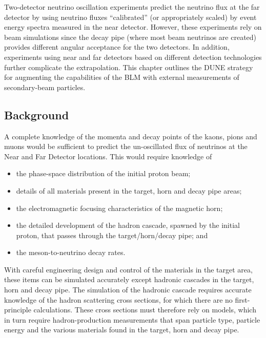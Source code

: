 Two-detector neutrino oscillation experiments predict the neutrino
flux at the far detector by using neutrino fluxes ``calibrated'' (or
appropriately scaled) by event energy spectra measured in the near
detector. However, these experiments rely on beam simulations since
the decay pipe (where most beam neutrinos are created) provides
different angular acceptance for the two detectors. In addition,
experiments using near and far detectors based on different detection
technologies further complicate the extrapolation. This chapter
outlines the DUNE strategy for augmenting the capabilities of the BLM
with external measurements of secondary-beam particles.

\subsection{Background}

A complete knowledge of the momenta and decay points of the kaons, pions and
muons would be sufficient to  predict the un-oscillated flux of neutrinos
at the Near and Far Detector locations. This would require knowledge of

\begin{itemize}
\item the phase-space distribution of the initial proton beam;
\item details of all materials present in the target, horn and decay pipe areas;
\item  the electromagnetic focusing characteristics of the magnetic horn;
\item the detailed development of the hadron cascade, spawned by the
initial proton, that passes through the target/horn/decay pipe; and
\item the meson-to-neutrino decay rates.
\end{itemize}

With careful engineering design and control of the materials in the target
area, these items can be simulated accurately except hadronic cascades in
the target, horn and decay pipe. The simulation of the hadronic cascade requires
accurate knowledge of the hadron scattering cross sections, for which there are no
first-principle calculations. These cross sections must therefore rely on models, which
in turn require hadron-production measurements that span particle type, particle
energy and the various materials found in the target, horn and decay pipe.

